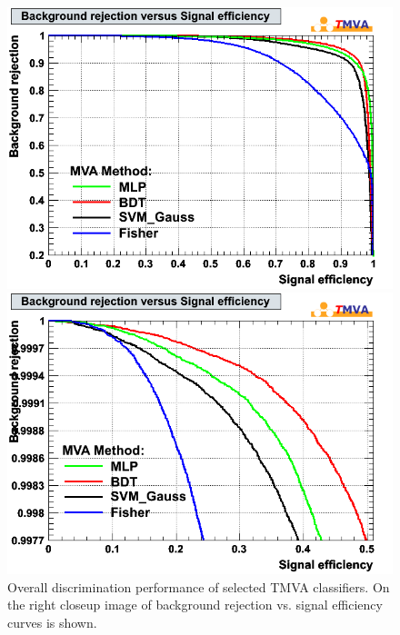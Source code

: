 \documentclass[a4paper]{jpconf}
\begin{document}
\begin{figure}[h]
 \begin{minipage}{8.0cm}
\includegraphics[width=1.0\textwidth]{images/mk_roc.png}
\end{minipage}
 \hfill
\begin{minipage}{8.0cm}
\includegraphics[width=1.0\textwidth]{images/mk_roc_zoomed.png}
\end{minipage}

\caption{Overall discrimination performance of selected TMVA classifiers. 
On the right closeup image of background rejection vs. signal efficiency curves is shown.}
\label{fig:roc}
\end{figure}
\end{document}
